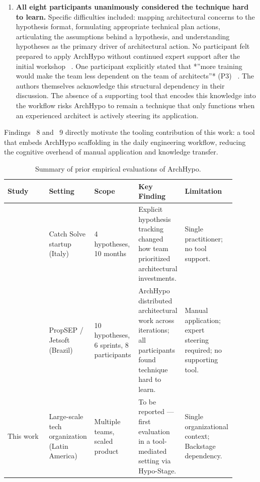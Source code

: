 \begin{enumerate}
  \item \textbf{All eight participants unanimously considered the technique hard to
  learn.} Specific difficulties included: mapping architectural concerns to the hypothesis
  format, formulating appropriate technical plan actions, articulating the assumptions
  behind a hypothesis, and understanding hypotheses as the primary driver of
  architectural action. No participant felt prepared to apply ArchHypo without
  continued expert support after the initial workshop ~\citep{silva2024tse}. 
  One participant explicitly stated that *''more training would make the team less dependent on the team of architects''* (P3) ~\citep{silva2024tse}. 
  The authors themselves acknowledge this structural dependency in their discussion. 
  The absence of a supporting tool that encodes this knowledge into the workflow risks ArchHypo to remain a technique that only functions when an experienced architect is actively steering its application.
\end{enumerate}

Findings ~8 and ~9 directly motivate the tooling contribution of this work: a tool that
embeds ArchHypo scaffolding in the daily engineering workflow, reducing the cognitive
overhead of manual application and knowledge transfer.

\begin{table}[htbp]
\centering
\caption{Summary of prior empirical evaluations of ArchHypo.}
\label{tab:archhypo-evaluations}
\begin{tabular}{p{0.18\linewidth} p{0.18\linewidth} p{0.18\linewidth} p{0.18\linewidth} p{0.18\linewidth}}
\toprule
\textbf{Study} & \textbf{Setting} & \textbf{Scope} & \textbf{Key Finding} & \textbf{Limitation} \\
\midrule
\citep{silva2024ieeesw} & Catch Solve startup (Italy) & 4 hypotheses, 10 months & Explicit hypothesis tracking changed how team prioritized architectural investments. & Single practitioner; no tool support. \\
\midrule
\citep{silva2024tse} & PropSEP / Jetsoft (Brazil) & 10 hypotheses, 6 sprints, 8 participants & ArchHypo distributed architectural work across iterations; all participants found technique hard to learn. & Manual application; expert steering required; no supporting tool. \\
\midrule
This work & Large-scale tech organization (Latin America) & Multiple teams, scaled product & To be reported --- first evaluation in a tool-mediated setting via Hypo-Stage. & Single organizational context; Backstage dependency. \\
\bottomrule
\end{tabular}
\end{table}

